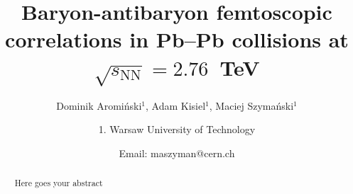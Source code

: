 \documentclass[ALICE,manyauthors]{ALICE_analysis_notes}
\begin{document}
%
%
%
\begin{titlepage}
%
\PHdate{\today}
%
\title{Baryon-antibaryon femtoscopic correlations in Pb--Pb collisions at $\sqrt{s_{\mathrm{NN}}}=2{.}76$~TeV}
%
\author{Dominik Aromi\'nski$^{1}$, Adam Kisiel$^{1}$, Maciej Szyma\'nski$^{1}$}
\author{
1. Warsaw University of Technology\\
}
\author{Email: maszyman@cern.ch}
%
%
\begin{abstract}
Here goes your abstract
\end{abstract}
\end{titlepage}
%
\end{document}
